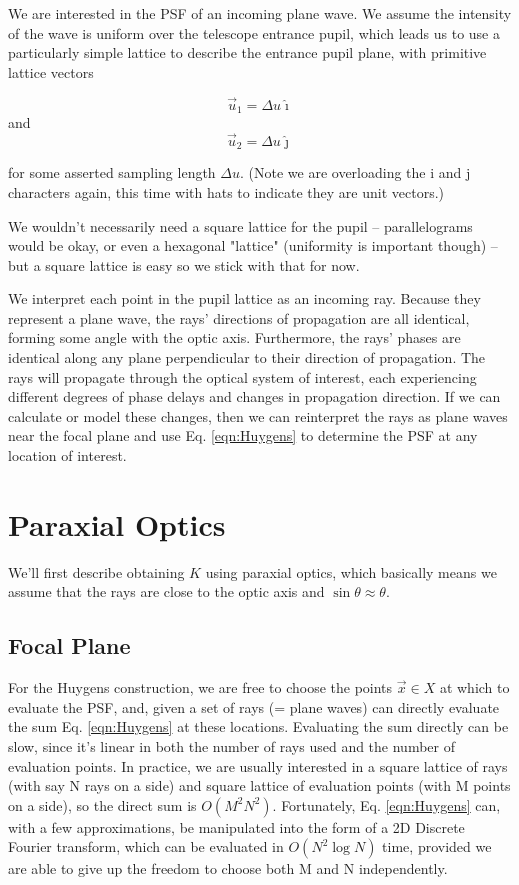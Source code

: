 \documentclass{article}
\begin{document}
We are interested in the PSF of an incoming plane wave.  We assume the intensity of the wave is
uniform over the telescope entrance pupil, which leads us to use a particularly simple lattice to
describe the entrance pupil plane, with primitive lattice vectors

\begin{equation}
    \vec{u}_1 = \Delta u \hat{\imath}
\end{equation}
and
\begin{equation}
    \vec{u}_2 = \Delta u \hat{\jmath}
\end{equation}

for some asserted sampling length $\Delta u$. (Note we are overloading the i and j characters again,
this time with hats to indicate they are unit vectors.)

We wouldn't necessarily need a square lattice for the pupil -- parallelograms would be okay, or even
a hexagonal "lattice" (uniformity is important though) --  but a square lattice is easy so we stick
with that for now.

We interpret each point in the pupil lattice as an incoming ray.  Because they represent a plane
wave, the rays' directions of propagation are all identical, forming some angle with the optic axis.
Furthermore, the rays' phases are identical along any plane perpendicular to their direction of
propagation.  The rays will propagate through the optical system of interest, each experiencing
different degrees of phase delays and changes in propagation direction.  If we can calculate or
model these changes, then we can reinterpret the rays as plane waves near the focal plane and use
Eq. \ref{eqn:Huygens} to determine the PSF at any location of interest.

\section{Paraxial Optics}

We'll first describe obtaining $K$ using paraxial optics, which basically means we assume that the
rays are close to the optic axis and $\sin \theta \approx \theta$.

\subsection{Focal Plane}

For the Huygens construction, we are free to choose the points $\vec{x} \in X$ at which to evaluate
the PSF, and, given a set of rays (= plane waves) can directly evaluate the sum Eq.
\ref{eqn:Huygens} at these locations.  Evaluating the sum directly can be slow, since it's linear in
both the number of rays used and the number of evaluation points.  In practice, we are usually
interested in a square lattice of rays (with say N rays on a side) and square lattice of evaluation
points (with M points on a side), so the direct sum is $O(M^2 N^2)$.  Fortunately, Eq.
\ref{eqn:Huygens} can, with a few approximations, be manipulated into the form of a 2D Discrete
Fourier transform, which can be evaluated in $O(N^2 \log N)$ time, provided we are able to give up
the freedom to choose both M and N independently.
\end{document}

